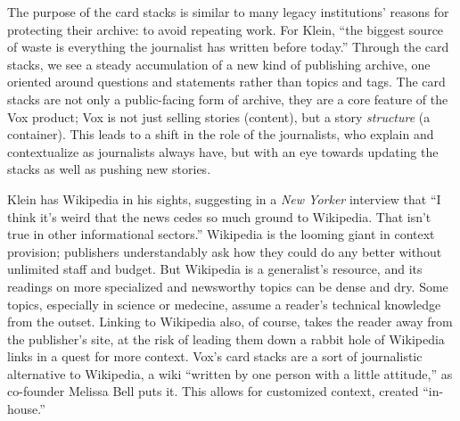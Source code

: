 The purpose of the card stacks is similar to many legacy institutions' reasons for protecting their archive: to avoid repeating work. For Klein, ``the biggest source of waste is everything the journalist has written before today.''\autocite{kaufman_vox_2014} Through the card stacks, we see a steady accumulation of a new kind of publishing archive, one oriented around questions and statements rather than topics and tags. The card stacks are not only a public-facing form of archive, they are a core feature of the Vox product; Vox is not just selling stories (content), but a story \emph{structure} (a container). This leads to a shift in the role of the journalists, who explain and contextualize as journalists always have, but with an eye towards updating the stacks as well as pushing new stories.

Klein has Wikipedia in his sights, suggesting in a \emph{New Yorker} interview that ``I think it's weird that the news cedes so much ground to Wikipedia. That isn't true in other informational sectors.''\autocite{coscarelli_ezra_2014} Wikipedia is the looming giant in context provision; publishers understandably ask how they could do any better without unlimited staff and budget. But Wikipedia is a generalist's resource, and its readings on more specialized and newsworthy topics can be dense and dry. Some topics, especially in science or medecine, assume a reader's technical knowledge from the outset. Linking to Wikipedia also, of course, takes the reader away from the publisher's site, at the risk of leading them down a rabbit hole of Wikipedia links in a quest for more context. Vox's card stacks are a sort of journalistic alternative to Wikipedia, a wiki ``written by one person with a little attitude,'' as co-founder Melissa Bell puts it.\autocite{kaufman_vox_2014} This allows for customized context, created ``in-house.''

